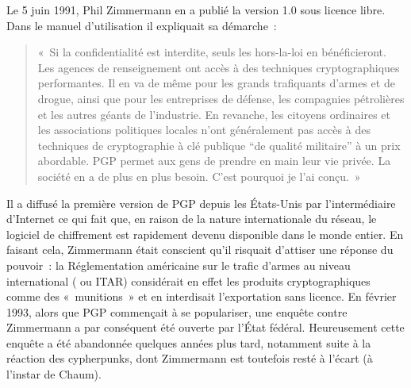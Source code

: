 Le 5 juin 1991, Phil Zimmermann en a publié la version 1.0 sous licence libre. Dans le manuel d'utilisation il expliquait sa démarche~:

\begin{quote}
«~Si la confidentialité est interdite, seuls les hors-la-loi en bénéficieront. Les agences de renseignement ont accès à des techniques cryptographiques performantes. Il en va de même pour les grands trafiquants d'armes et de drogue, ainsi que pour les entreprises de défense, les compagnies pétrolières et les autres géants de l'industrie. En revanche, les citoyens ordinaires et les associations politiques locales n'ont généralement pas accès à des techniques de cryptographie à clé publique “de qualité militaire” à un prix abordable. PGP permet aux gens de prendre en main leur vie privée. La société en a de plus en plus besoin. C'est pourquoi je l'ai conçu.~»
\end{quote} %


Il a diffusé la première version de PGP depuis les États-Unis par l'intermédiaire d'Internet ce qui fait que, en raison de la nature internationale du réseau, le logiciel de chiffrement est rapidement devenu disponible dans le monde entier. En faisant cela, Zimmermann était conscient qu'il risquait d'attiser une réponse du pouvoir~: la Réglementation américaine sur le trafic d'armes au niveau international ( ou ITAR) considérait en effet les produits cryptographiques comme des «~munitions~» et en interdisait l'exportation sans licence. En février 1993, alors que PGP commençait à se populariser, une enquête contre Zimmermann a par conséquent été ouverte par l'État fédéral. Heureusement cette enquête a été abandonnée quelques années plus tard, notamment suite à la réaction des cypherpunks, dont Zimmermann est toutefois resté à l'écart (à l'instar de Chaum). %

